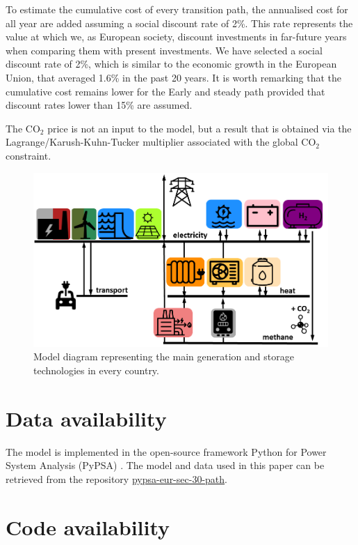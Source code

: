 \documentclass[5p]{elsarticle} %
\begin{document}
To estimate the cumulative cost of every transition path, the annualised cost for all year are added assuming a social discount rate of 2\%. This rate represents the value at which we, as European society, discount investments in far-future years when comparing them with present investments. We have selected a social discount rate of 2\%, which is similar to the economic growth in the European Union, that averaged 1.6\% in the past 20 years. It is worth remarking that the cumulative cost remains lower for the Early and steady path provided that discount rates lower than 15\% are assumed.

 The CO$_2$ price is not an input to the model, but a result that is obtained via the Lagrange/Karush-Kuhn-Tucker multiplier associated with the global CO$_2$ constraint. 


\begin{figure}[!h]
\centering
\includegraphics[width=\columnwidth]{../figures/model.png}
\caption{Model diagram representing the main generation and storage technologies in every country.} \label{fig_model} 
\end{figure}

\section{Data availability}

The model is implemented in the open-source framework Python for Power System Analysis (PyPSA) \cite{PyPSA}. The model and data used in this paper can be retrieved from the repository \href{https://github.com/martavp/pypsa-eur-sec-30-path}{pypsa-eur-sec-30-path}. 

\section{Code availability}
\end{document}
